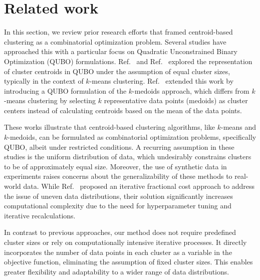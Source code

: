 \section{Related work}
\label{sec:related}

In this section, we review prior research efforts that framed centroid-based clustering as a combinatorial optimization problem. Several studies have approached this with a particular focus on Quadratic Unconstrained Binary Optimization (QUBO) formulations.
Ref.~\cite{bauckhage2018ising} and Ref.~\cite{arthur2021balanced} explored the representation of cluster centroids in QUBO under the assumption of equal cluster sizes, typically in the context of $k$-means clustering. Ref.~\cite{bauckhage2019qubo} extended this work by introducing a QUBO formulation of the $k$-medoids approach, which differs from $k$-means clustering by selecting $k$ representative data points (medoids) as cluster centers instead of calculating centroids based on the mean of the data points.

These works illustrate that centroid-based clustering algorithms, like $k$-means and $k$-medoids, can be formulated as combinatorial optimization problems, specifically QUBO, albeit under restricted conditions. A recurring assumption in these studies is the uniform distribution of data, which undesirably constrains clusters to be of approximately equal size. Moreover, the use of synthetic data in experiments raises concerns about the generalizability of these methods to real-world data. While Ref.~\cite{matsumoto2022distance} proposed an iterative fractional cost approach to address the issue of uneven data distributions, their solution significantly increases computational complexity due to the need for hyperparameter tuning and iterative recalculations.

In contrast to previous approaches, our method does not require predefined cluster sizes or rely on computationally intensive iterative processes. It directly incorporates the number of data points in each cluster as a variable in the objective function, eliminating the assumption of fixed cluster sizes. This enables greater flexibility and adaptability to a wider range of data distributions.